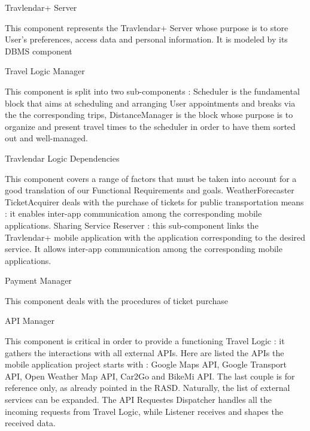 Travlendar+ Server

This component represents the Travlendar+ Server whose  purpose is to store User's preferences, access data and personal information. It is modeled by its DBMS component

Travel Logic Manager

This component is split into two sub-components : Scheduler is the fundamental block that aims at scheduling and arranging User appointments and breaks via the the corresponding trips, DistanceManager is the block whose purpose is to organize and present travel times to the scheduler in order to have them sorted out and well-managed.

Travlendar Logic Dependencies

This component covers a range of factors that must be taken into account for a good translation of our Functional Requirements and goals. WeatherForecaster 
TicketAcquirer deals with the purchase of tickets for public transportation means : it enables inter-app communication among the corresponding mobile applications.
Sharing Service Reserver : this sub-component links the Travlendar+ mobile application with the application corresponding to the desired service. It allows inter-app communication among the corresponding mobile applications. 

Payment Manager

This component deals with the procedures of ticket purchase

API Manager

This component is critical in order to provide a functioning Travel Logic : it gathers the interactions with all external APIs. Here are listed the APIs the mobile application project starts with : Google Maps API, Google Transport API, Open Weather Map API, Car2Go and BikeMi API. The last couple is for reference only, as already pointed in the RASD. Naturally, the list of external services can be expanded.
The API Requestes Dispatcher handles all the incoming requests from Travel Logic, while Listener receives and shapes the received data.




